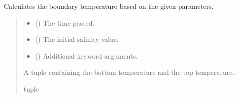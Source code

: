 \documentclass[a4paper,11pt,english,openany]{sphinxmanual}
\begin{document}
\begin{fulllineitems}
\label{\detokenize{api/spyice.preprocess.initial_boundary_conditions:spyice.preprocess.initial_boundary_conditions.calculate_boundary_temperature}}
\pysigstartsignatures
{}
\pysigstopsignatures
\sphinxAtStartPar
Calculates the boundary temperature based on the given parameters.
\begin{quote}\begin{description}
\begin{itemize}
\item {} 
\sphinxAtStartPar
{} () \textendash{} The time passed.

\item {} 
\sphinxAtStartPar
{} () \textendash{} The initial salinity value.

\item {} 
\sphinxAtStartPar
{} () \textendash{} Additional keyword arguments.

\end{itemize}

\sphinxAtStartPar
A tuple containing the bottom temperature and the top temperature.

\sphinxAtStartPar
tuple

\end{description}\end{quote}

\end{fulllineitems}

\end{document}
